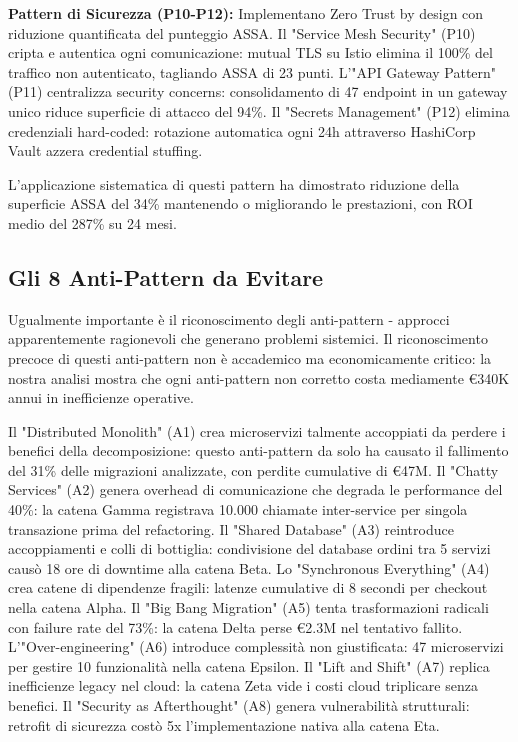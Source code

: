 \textbf{Pattern di Sicurezza (P10-P12):} Implementano Zero Trust by design con riduzione quantificata del punteggio ASSA. Il "Service Mesh Security" (P10) cripta e autentica ogni comunicazione: mutual TLS su Istio elimina il 100\% del traffico non autenticato, tagliando ASSA di 23 punti. L'"API Gateway Pattern" (P11) centralizza security concerns: consolidamento di 47 endpoint in un gateway unico riduce superficie di attacco del 94\%. Il "Secrets Management" (P12) elimina credenziali hard-coded: rotazione automatica ogni 24h attraverso HashiCorp Vault azzera credential stuffing.

L'applicazione sistematica di questi pattern ha dimostrato riduzione della superficie ASSA del 34\% mantenendo o migliorando le prestazioni, con ROI medio del 287\% su 24 mesi.

\subsection{\texorpdfstring{Gli 8 Anti-Pattern da Evitare}{3.4.2 - Gli 8 Anti-Pattern da Evitare}}

Ugualmente importante è il riconoscimento degli anti-pattern - approcci apparentemente ragionevoli che generano problemi sistemici. Il riconoscimento precoce di questi anti-pattern non è accademico ma economicamente critico: la nostra analisi mostra che ogni anti-pattern non corretto costa mediamente €340K annui in inefficienze operative.

Il "Distributed Monolith" (A1) crea microservizi talmente accoppiati da perdere i benefici della decomposizione: questo anti-pattern da solo ha causato il fallimento del 31\% delle migrazioni analizzate, con perdite cumulative di €47M. Il "Chatty Services" (A2) genera overhead di comunicazione che degrada le performance del 40\%: la catena Gamma registrava 10.000 chiamate inter-service per singola transazione prima del refactoring. Il "Shared Database" (A3) reintroduce accoppiamenti e colli di bottiglia: condivisione del database ordini tra 5 servizi causò 18 ore di downtime alla catena Beta. Lo "Synchronous Everything" (A4) crea catene di dipendenze fragili: latenze cumulative di 8 secondi per checkout nella catena Alpha. Il "Big Bang Migration" (A5) tenta trasformazioni radicali con failure rate del 73\%: la catena Delta perse €2.3M nel tentativo fallito. L'"Over-engineering" (A6) introduce complessità non giustificata: 47 microservizi per gestire 10 funzionalità nella catena Epsilon. Il "Lift and Shift" (A7) replica inefficienze legacy nel cloud: la catena Zeta vide i costi cloud triplicare senza benefici. Il "Security as Afterthought" (A8) genera vulnerabilità strutturali: retrofit di sicurezza costò 5x l'implementazione nativa alla catena Eta.

